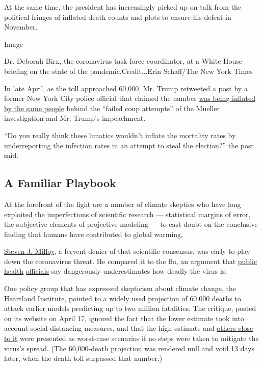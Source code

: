 At the same time, the president has increasingly picked up on talk from
the political fringes of inflated death counts and plots to ensure his
defeat in November.

Image

Dr. Deborah Birx, the coronavirus task force coordinator, at a White
House briefing on the state of the pandemic.Credit...Erin Schaff/The New
York Times

In late April, as the toll approached 60,000, Mr. Trump retweeted a post
by a former New York City police official that claimed the number
\href{https://twitter.com/johncardillo/status/1254481206936326145?s=20}{was
being inflated by the same people} behind the ``failed coup attempts''
of the Mueller investigation and Mr. Trump's impeachment.

``Do you really think these lunatics wouldn't inflate the mortality
rates by underreporting the infection rates in an attempt to steal the
election?'' the post said.

\hypertarget{a-familiar-playbook}{%
\subsection{A Familiar Playbook}\label{a-familiar-playbook}}

At the forefront of the fight are a number of climate skeptics who have
long exploited the imperfections of scientific research --- statistical
margins of error, the subjective elements of projective modeling --- to
cast doubt on the conclusive finding that humans have contributed to
global warming.

\href{https://webcache.googleusercontent.com/search?q=cache:yq9FTH6O0LIJ:https://twitter.com/JunkScience/status/1232675902229811201+\&cd=11\&hl=en\&ct=clnk\&gl=us}{Steven
J. Milloy}, a fervent denier of that scientific consensus, was early to
play down the coronavirus threat. He compared it to the flu, an argument
that
\href{https://www.salon.com/2020/03/22/we-have-to-stop-comparing-this-coronavirus-to-the-flu_partner/}{public
health}
\href{https://www.foxnews.com/politics/fauci-explains-why-coronavirus-is-worse-than-flu-warns-against-americans-fleeing-europe-immediately}{officials}
say dangerously underestimates how deadly the virus is.

One policy group that has expressed skepticism about climate change, the
Heartland Institute, pointed to a widely used projection of 60,000
deaths to attack earlier models predicting up to two million fatalities.
The critique, posted on its website on April 17, ignored the fact that
the lower estimate took into account social-distancing measures, and
that the high estimate and
\href{https://www.nytimes3xbfgragh.onion/2020/03/13/us/coronavirus-deaths-estimate.html}{others
close to it} were presented as worst-case scenarios if no steps were
taken to mitigate the virus's spread. (The 60,000-death projection was
rendered null and void 13 days later, when the death toll surpassed that
number.)

